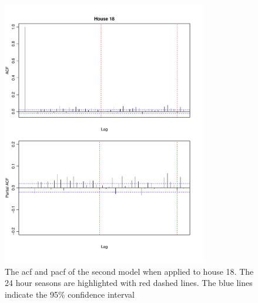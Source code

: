 \begin{figure}
    \centering
    \includegraphics[width=0.8\textwidth]{../../../figures/arimax/ACF_18_short.pdf}
    \caption{The acf and pacf of the second model when applied to house 18. The 24 hour seasons are highlighted with red dashed lines. The blue lines indicate the 95\% confidence interval}
    \label{fig:Model2_acf_18}
\end{figure}    


